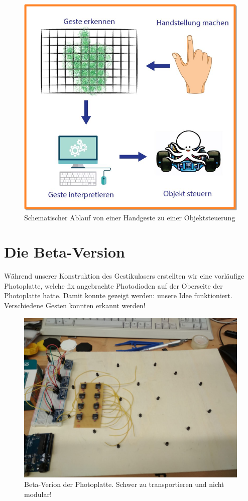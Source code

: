 \documentclass{sciposter}
\begin{document}
\begin{multicols}{3}
\begin{figure}[h]
	\centering
	\includegraphics[scale=1.3]{figures/AblaufGestikulaser.png}
	\caption{Schematischer Ablauf von einer Handgeste zu einer Objektsteuerung}
	\label{fig:Sensorhandschuh}
\end{figure}

\section{Die Beta-Version}
Während unserer Konstruktion des Gestikulasers erstellten wir eine vorläufige Photoplatte, welche fix angebrachte Photodioden auf der Oberseite der Photoplatte hatte. Damit konnte gezeigt werden: unsere Idee funktioniert. Verschiedene Gesten konnten erkannt werden!

\begin{figure}[h]
	\centering
	\includegraphics[scale=0.35]{figures/PhotoplatteBeta.jpeg}
	\caption{Beta-Verion der Photoplatte. Schwer zu transportieren und nicht modular!}
	\label{fig:Sensorhandschuh}
\end{figure}


\end{multicols}
\end{document}
